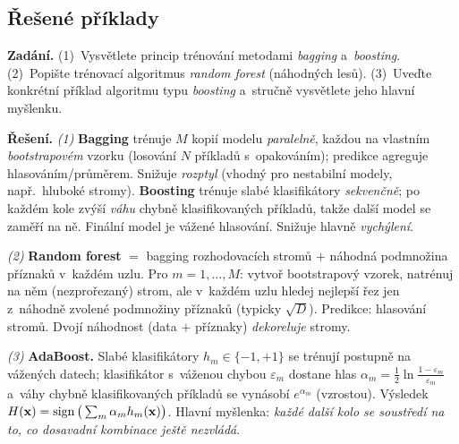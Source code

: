 \subsection{Řešené příklady}

\begin{priklad}
\par
\textbf{Zadání.} (1)~Vysvětlete princip trénování metodami \emph{bagging} a~\emph{boosting}. (2)~Popište trénovací algoritmus \emph{random forest} (náhodných lesů). (3)~Uveďte konkrétní příklad algoritmu typu \emph{boosting} a~stručně vysvětlete jeho hlavní myšlenku.

\smallskip
\textbf{Řešení.}
\emph{(1)} \textbf{Bagging} trénuje $M$ kopií modelu \emph{paralelně}, každou na vlastním \emph{bootstrapovém} vzorku (losování $N$ příkladů s~opakováním); predikce agreguje hlasováním/průměrem. Snižuje \emph{rozptyl} (vhodný pro nestabilní modely, např.\ hluboké stromy). \textbf{Boosting} trénuje slabé klasifikátory \emph{sekvenčně}; po každém kole zvýší \emph{váhu} chybně klasifikovaných příkladů, takže další model se zaměří na ně. Finální model je vážené hlasování. Snižuje hlavně \emph{vychýlení}.

\emph{(2)} \textbf{Random forest} $=$ bagging rozhodovacích stromů $+$ náhodná podmnožina příznaků v~každém uzlu. Pro $m=1,\dots,M$: vytvoř bootstrapový vzorek, natrénuj na něm (nezprořezaný) strom, ale v~každém uzlu hledej nejlepší řez jen z~náhodně zvolené podmnožiny příznaků (typicky $\sqrt{D}$). Predikce: hlasování stromů. Dvojí náhodnost (data $+$ příznaky) \emph{dekoreluje} stromy.

\emph{(3)} \textbf{AdaBoost.} Slabé klasifikátory $h_m\in\{-1,+1\}$ se trénují postupně na vážených datech; klasifikátor s~váženou chybou $\varepsilon_m$ dostane hlas $\alpha_m=\tfrac12\ln\tfrac{1-\varepsilon_m}{\varepsilon_m}$ a~váhy chybně klasifikovaných příkladů se vynásobí $e^{\alpha_m}$ (vzrostou). Výsledek $H(\mathbf{x})=\operatorname{sign}\big(\sum_m \alpha_m h_m(\mathbf{x})\big)$. Hlavní myšlenka: \emph{každé další kolo se soustředí na to, co dosavadní kombinace ještě nezvládá}.
\end{priklad}

